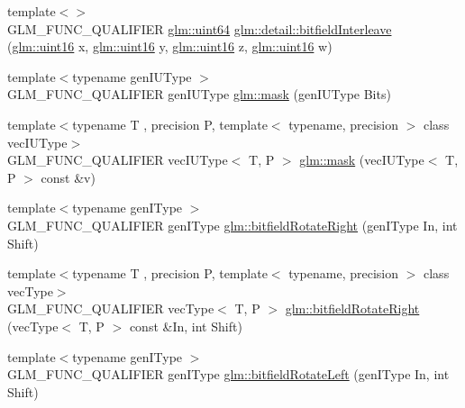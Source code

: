 \begin{DoxyCompactItemize}
\item 
{\footnotesize template$<$$>$ }\\G\+L\+M\+\_\+\+F\+U\+N\+C\+\_\+\+Q\+U\+A\+L\+I\+F\+I\+E\+R \hyperlink{group__gtc__type__precision_gae3632bf9b37da66233d78930dd06378a}{glm\+::uint64} \hyperlink{namespaceglm_1_1detail_a3ed141c5adbf2e1209ffe2081d98ba4c}{glm\+::detail\+::bitfield\+Interleave} (\hyperlink{group__gtc__type__precision_gad8c2939e1fdd8e5828b31d95c52255d5}{glm\+::uint16} x, \hyperlink{group__gtc__type__precision_gad8c2939e1fdd8e5828b31d95c52255d5}{glm\+::uint16} y, \hyperlink{group__gtc__type__precision_gad8c2939e1fdd8e5828b31d95c52255d5}{glm\+::uint16} z, \hyperlink{group__gtc__type__precision_gad8c2939e1fdd8e5828b31d95c52255d5}{glm\+::uint16} w)
\item 
{\footnotesize template$<$typename gen\+I\+U\+Type $>$ }\\G\+L\+M\+\_\+\+F\+U\+N\+C\+\_\+\+Q\+U\+A\+L\+I\+F\+I\+E\+R gen\+I\+U\+Type \hyperlink{group__gtc__bitfield_gad7eba518a0b71662114571ee76939f8a}{glm\+::mask} (gen\+I\+U\+Type Bits)
\item 
{\footnotesize template$<$typename T , precision P, template$<$ typename, precision $>$ class vec\+I\+U\+Type$>$ }\\G\+L\+M\+\_\+\+F\+U\+N\+C\+\_\+\+Q\+U\+A\+L\+I\+F\+I\+E\+R vec\+I\+U\+Type$<$ T, P $>$ \hyperlink{group__gtc__bitfield_ga073dbd8642f550b51da3572541431c1c}{glm\+::mask} (vec\+I\+U\+Type$<$ T, P $>$ const \&v)
\item 
{\footnotesize template$<$typename gen\+I\+Type $>$ }\\G\+L\+M\+\_\+\+F\+U\+N\+C\+\_\+\+Q\+U\+A\+L\+I\+F\+I\+E\+R gen\+I\+Type \hyperlink{namespaceglm_a29f065281c52cf3ca7695e71504687fc}{glm\+::bitfield\+Rotate\+Right} (gen\+I\+Type In, int Shift)
\item 
{\footnotesize template$<$typename T , precision P, template$<$ typename, precision $>$ class vec\+Type$>$ }\\G\+L\+M\+\_\+\+F\+U\+N\+C\+\_\+\+Q\+U\+A\+L\+I\+F\+I\+E\+R vec\+Type$<$ T, P $>$ \hyperlink{group__gtc__bitfield_ga96b56fd2adad1eeaee9e10dfe83904ba}{glm\+::bitfield\+Rotate\+Right} (vec\+Type$<$ T, P $>$ const \&In, int Shift)
\item 
{\footnotesize template$<$typename gen\+I\+Type $>$ }\\G\+L\+M\+\_\+\+F\+U\+N\+C\+\_\+\+Q\+U\+A\+L\+I\+F\+I\+E\+R gen\+I\+Type \hyperlink{namespaceglm_ae088d9983f8cb8fcf0aacae4ae51462a}{glm\+::bitfield\+Rotate\+Left} (gen\+I\+Type In, int Shift)
\item 

\end{DoxyCompactItemize}
